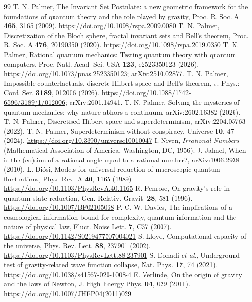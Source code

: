 \documentclass[aps,prd,twocolumn,superscriptaddress,nofootinbib,showkeys]{revtex4-2}
\begin{document}
\begin{thebibliography}{99}
 T. N. Palmer, The Invariant Set Postulate: a new geometric framework for the foundations of quantum theory and the role played by gravity, Proc. R. Soc. A \textbf{465}, 3165 (2009). \url{https://doi.org/10.1098/rspa.2009.0080}
 T. N. Palmer, Discretization of the Bloch sphere, fractal invariant sets and Bell's theorem, Proc. R. Soc. A \textbf{476}, 20190350 (2020). \url{https://doi.org/10.1098/rspa.2019.0350}
 T. N. Palmer, Rational quantum mechanics: Testing quantum theory with quantum computers, Proc. Natl. Acad. Sci. USA \textbf{123}, e2523350123 (2026). \url{https://doi.org/10.1073/pnas.2523350123}; arXiv:2510.02877.
 T. N. Palmer, Impossible counterfactuals, discrete Hilbert space and Bell's theorem, J. Phys.: Conf. Ser. \textbf{3189}, 012006 (2026). \url{https://doi.org/10.1088/1742-6596/3189/1/012006}; arXiv:2601.14941.
 T. N. Palmer, Solving the mysteries of quantum mechanics: why nature abhors a continuum, arXiv:2602.16382 (2026).
 T. N. Palmer, Discretised Hilbert space and superdeterminism, arXiv:2204.05763 (2022).
 T. N. Palmer, Superdeterminism without conspiracy, Universe \textbf{10}, 47 (2024). \url{https://doi.org/10.3390/universe10010047}
 I. Niven, \emph{Irrational Numbers} (Mathematical Association of America, Washington, DC, 1956).
 J. Jahnel, When is the (co)sine of a rational angle equal to a rational number?, arXiv:1006.2938 (2010).
 L. Di\'osi, Models for universal reduction of macroscopic quantum fluctuations, Phys. Rev. A \textbf{40}, 1165 (1989). \url{https://doi.org/10.1103/PhysRevA.40.1165}
 R. Penrose, On gravity's role in quantum state reduction, Gen. Relativ. Gravit. \textbf{28}, 581 (1996). \url{https://doi.org/10.1007/BF02105068}
 P. C. W. Davies, The implications of a cosmological information bound for complexity, quantum information and the nature of physical law, Fluct. Noise Lett. \textbf{7}, C37 (2007). \url{https://doi.org/10.1142/S0219477507004021}
 S. Lloyd, Computational capacity of the universe, Phys. Rev. Lett. \textbf{88}, 237901 (2002). \url{https://doi.org/10.1103/PhysRevLett.88.237901}
 S. Donadi \emph{et al.}, Underground test of gravity-related wave function collapse, Nat. Phys. \textbf{17}, 74 (2021). \url{https://doi.org/10.1038/s41567-020-1008-4}
 E. Verlinde, On the origin of gravity and the laws of Newton, J. High Energy Phys. \textbf{04}, 029 (2011). \url{https://doi.org/10.1007/JHEP04(2011)029}

\end{thebibliography}
\end{document}

